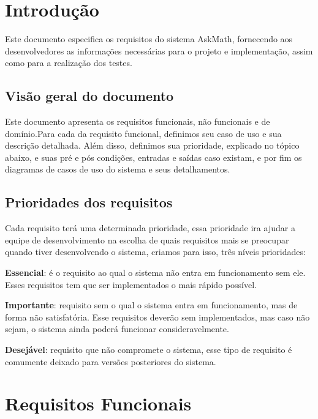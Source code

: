 \label{ap:requisitos}

\section{Introdução}
Este documento especifica os requisitos do sistema AskMath, fornecendo aos desenvolvedores as informações necessárias para o projeto e implementação, assim como para a realização dos testes. 

\subsection{Visão geral do documento}
Este documento apresenta os requisitos funcionais, n\~ao funcionais e de domínio.Para cada da requisito funcional, definimos seu caso de uso e sua descrição detalhada. Além disso, definimos sua 
prioridade, explicado no tópico abaixo, e suas pré e pós condições, entradas e saídas caso existam, e por fim os diagramas de casos de uso do sistema e seus detalhamentos.

\subsection{Prioridades dos requisitos}
Cada requisito terá uma determinada prioridade, essa prioridade ira ajudar a equipe de desenvolvimento na escolha de quais requisitos mais se preocupar quando tiver desenvolvendo o sistema, criamos para isso, três níveis prioridades:

\begin{alineascomponto}
	\item \textbf{Essencial}: é o requisito ao qual o sistema não entra em funcionamento sem ele. Esses requisitos tem que ser implementados o mais rápido possível. 
    \item \textbf{Importante}: requisito sem o qual o sistema entra em funcionamento, mas de forma não satisfatória. Esse requisitos deverão sem implementados, mas caso não sejam, o sistema ainda 
poderá funcionar consideravelmente.
	\item \textbf{Desejável}: requisito que não compromete o sistema, esse tipo de requisito é comumente deixado para versões posteriores do sistema.
\end{alineascomponto}

\section{Requisitos Funcionais}

